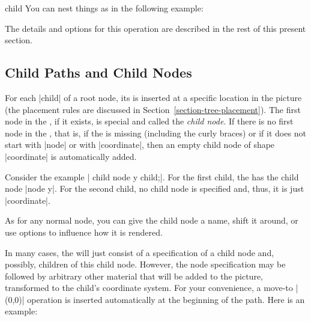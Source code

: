 \begin{pathoperation}{child}{%
    }
  You can nest things as in the following example:
\begin{codeexample}[]
\end{codeexample}

  The details and options for this operation are described in the rest
  of this present section.
\end{pathoperation}



\subsection{Child Paths and Child Nodes}

For each |child| of a root node, its  is inserted at
a specific location in the picture (the placement rules are discussed
in Section~\ref{section-tree-placement}). The first node in the
, if it exists, is special and called the \emph{child
  node}. If there is no first node in the , that is,
if the  is missing (including the curly braces) or if
it does not start with |node| or with |coordinate|, then an empty
child node of shape |coordinate| is automatically added.

Consider the example | child {node {y}} child;|. For the
first child, the  has the child node |node {y}|. For
the second child, no child node is specified and, thus, it is just
|coordinate|.

As for any normal node, you can give the child node a name, shift it
around, or use options to influence how it is rendered.
\begin{codeexample}[]
\end{codeexample}

In many cases, the  will just consist of a
specification of a child node and, possibly, children of this child
node. However, the node specification may be followed by arbitrary
other material that will be added to the picture, transformed to the
child's coordinate system. For your convenience, a move-to |(0,0)|
operation is inserted automatically at the beginning of the path. Here
is an example:

